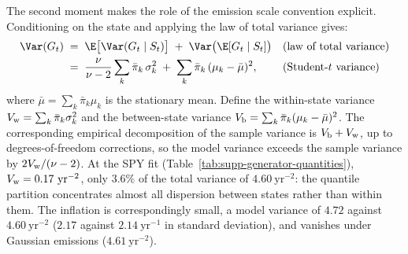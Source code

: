 The second moment makes the role of the emission scale convention
explicit. Conditioning on the state and applying the law of total
variance gives:
\begin{align}
  \Var(G_t)
   &\;=\; \E\big[\Var(G_t \mid S_t)\big]
     \;+\; \Var\big(\E[G_t \mid S_t]\big)
     && \text{(law of total variance)} \notag \\
   &\;=\; \frac{\nu}{\nu - 2} \sum_k \bar\pi_k\, \sigma_k^2
     \;+\; \sum_k \bar\pi_k\, (\mu_k - \bar\mu)^2,
     && \text{(Student-$t$ variance)}
  \label{eq:supp-variance}
\end{align}
where $\bar\mu = \sum_k \bar\pi_k \mu_k$ is the stationary mean.
Define the within-state variance $V_{\rm w} = \sum_k \bar\pi_k
\sigma_k^2$ and the between-state variance $V_{\rm b} = \sum_k
\bar\pi_k (\mu_k - \bar\mu)^2$. The corresponding empirical
decomposition of the sample variance is $V_{\rm b} + V_{\rm w}$, up to
degrees-of-freedom corrections, so the model variance exceeds the
sample variance by $2 V_{\rm w} / (\nu - 2)$. At the SPY fit
(Table~\ref{tab:supp-generator-quantities}),
$V_{\rm w} = 0.17~\mathrm{yr}^{-2}$, only $3.6\%$ of the total
variance of $4.60~\mathrm{yr}^{-2}$: the quantile partition
concentrates almost all dispersion between states rather than within
them. The inflation is correspondingly small, a model variance of
$4.72$ against $4.60~\mathrm{yr}^{-2}$ ($2.17$ against
$2.14~\mathrm{yr}^{-1}$ in standard deviation), and vanishes
under Gaussian emissions ($4.61~\mathrm{yr}^{-2}$).

